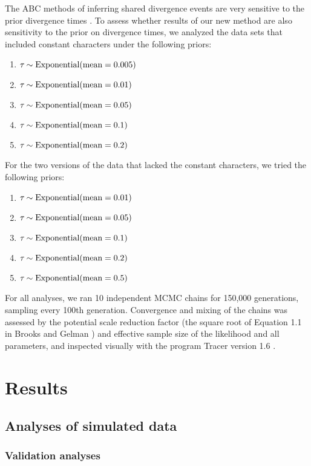 The ABC methods of inferring shared divergence events are very sensitive to the
prior divergence times
\citep{Oaks2012,Hickerson2013,Oaks2014reply,Oaks2014dpp}.
To assess whether results of our new method are also sensitivity to the
prior on divergence times, we analyzed the data sets that included constant
characters under the following priors:
\begin{enumerate}
    \item $\tau_{} \sim \textrm{Exponential}(\textrm{mean} = 0.005)$
    \item $\tau_{} \sim \textrm{Exponential}(\textrm{mean} = 0.01)$
    \item $\tau_{} \sim \textrm{Exponential}(\textrm{mean} = 0.05)$
    \item $\tau_{} \sim \textrm{Exponential}(\textrm{mean} = 0.1)$
    \item $\tau_{} \sim \textrm{Exponential}(\textrm{mean} = 0.2)$
\end{enumerate}
For the two versions of the  data that lacked the constant
characters, we tried the following priors:
\begin{enumerate}
    \item $\tau_{} \sim \textrm{Exponential}(\textrm{mean} = 0.01)$
    \item $\tau_{} \sim \textrm{Exponential}(\textrm{mean} = 0.05)$
    \item $\tau_{} \sim \textrm{Exponential}(\textrm{mean} = 0.1)$
    \item $\tau_{} \sim \textrm{Exponential}(\textrm{mean} = 0.2)$
    \item $\tau_{} \sim \textrm{Exponential}(\textrm{mean} = 0.5)$
\end{enumerate}

For all analyses, we ran 10 independent MCMC chains for 150,000 generations,
sampling every 100th generation.
Convergence and mixing of the chains was assessed by the potential scale
reduction factor (the square root of Equation 1.1 in Brooks and Gelman
\citeyear{Brooks1998}) and effective sample size \citep{Gong2014} of the
likelihood and all parameters, and inspected visually with the program Tracer
version 1.6
\citep{Tracer16}.


\section{Results}

\subsection{Analyses of simulated data}

\subsubsection{Validation analyses}

